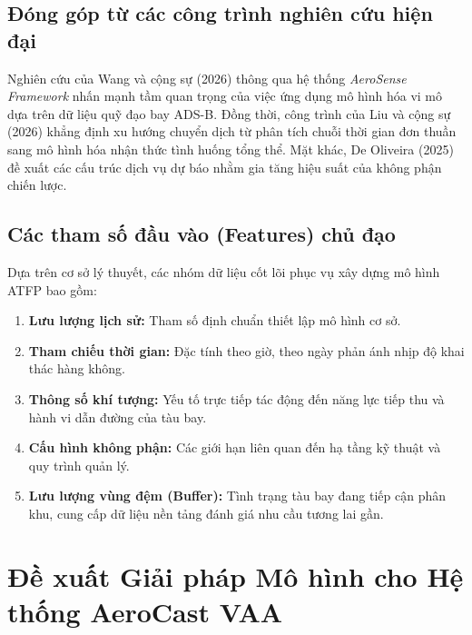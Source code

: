 \documentclass[12pt,a4paper]{article}
\begin{document}
\subsection{Đóng góp từ các công trình nghiên cứu hiện đại}

Nghiên cứu của Wang và cộng sự (2026) thông qua hệ thống \textit{AeroSense Framework} \cite{wang2026air} nhấn mạnh tầm quan trọng của việc ứng dụng mô hình hóa vi mô dựa trên dữ liệu quỹ đạo bay ADS-B. Đồng thời, công trình của Liu và cộng sự (2026) \cite{liu2026situation} khẳng định xu hướng chuyển dịch từ phân tích chuỗi thời gian đơn thuần sang mô hình hóa nhận thức tình huống tổng thể. Mặt khác, De Oliveira (2025) \cite{deoliveira2025predictive} đề xuất các cấu trúc dịch vụ dự báo nhằm gia tăng hiệu suất của không phận chiến lược.

\subsection{Các tham số đầu vào (Features) chủ đạo}

Dựa trên cơ sở lý thuyết, các nhóm dữ liệu cốt lõi phục vụ xây dựng mô hình ATFP bao gồm:
\begin{enumerate}
    \item \textbf{Lưu lượng lịch sử:} Tham số định chuẩn thiết lập mô hình cơ sở.
    \item \textbf{Tham chiếu thời gian:} Đặc tính theo giờ, theo ngày phản ánh nhịp độ khai thác hàng không.
    \item \textbf{Thông số khí tượng:} Yếu tố trực tiếp tác động đến năng lực tiếp thu và hành vi dẫn đường của tàu bay.
    \item \textbf{Cấu hình không phận:} Các giới hạn liên quan đến hạ tầng kỹ thuật và quy trình quản lý.
    \item \textbf{Lưu lượng vùng đệm (Buffer):} Tình trạng tàu bay đang tiếp cận phân khu, cung cấp dữ liệu nền tảng đánh giá nhu cầu tương lai gần.
\end{enumerate}


\section{Đề xuất Giải pháp Mô hình cho Hệ thống AeroCast VAA}
\end{document}
